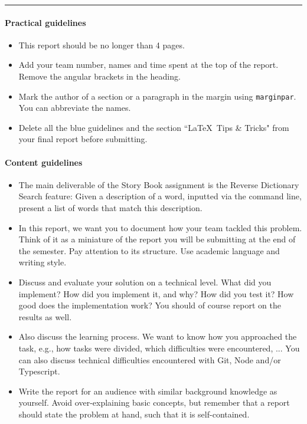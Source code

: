 \documentclass[a4paper,11pt]{article}
\newcommand{\exampletext}[1]{{\color{blue!60!black}#1}}
\begin{document}
  \noindent
  {\color[HTML]{52BDEC} \rule{\linewidth}{1mm} }

\exampletext{
  \paragraph{Practical guidelines}
  \begin{itemize}
      \item This report should be no longer than 4 pages.
      \item Add your team number, names and time spent at the top of the report. Remove the angular brackets in the heading.
      \item Mark the author of a section or a paragraph in the margin using \texttt{marginpar}. You can abbreviate the names.
      \item Delete all the blue guidelines and the section ``\LaTeX~Tips \& Tricks" from your final report before submitting.
  \end{itemize}  
\paragraph{Content guidelines}
\begin{itemize}
  \item The main deliverable of the Story Book assignment is the Reverse Dictionary Search feature: Given a description of a word, inputted via the command line, present a list of words that match this description.
  \item In this report, we want you to document how your team tackled this problem. Think of it as a miniature of the report you will be submitting at the end of the semester. Pay attention to its structure. Use academic language and writing style.
  \item Discuss and evaluate your solution on a technical level. What did you implement? How did you implement it, and why? How did you test it? How good does the implementation work? You should of course report on the results as well.
  \item Also discuss the learning process. We want to know how you approached the task, e.g., how tasks were divided, which difficulties were encountered, ... You can also discuss technical difficulties encountered with Git, Node and/or Typescript.
  \item Write the report for an audience with similar background knowledge as yourself. Avoid over-explaining basic concepts, but remember that a report should state the problem at hand, such that it is self-contained.
\end{itemize}
}
\end{document}
